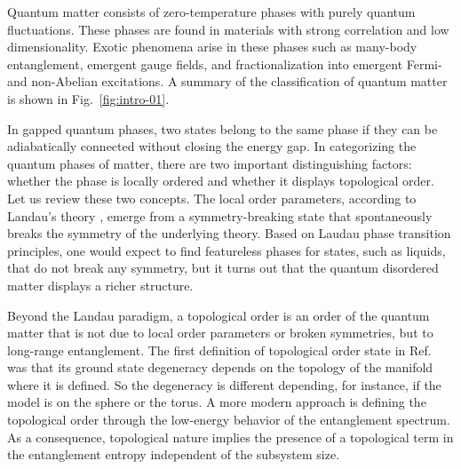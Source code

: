 

Quantum matter consists of zero-temperature phases with purely quantum fluctuations. %
These phases are found in materials with strong correlation and low dimensionality.
Exotic phenomena arise in these phases such as many-body entanglement, emergent gauge fields, and fractionalization into emergent Fermi- and non-Abelian excitations.
A summary of the classification of quantum matter is shown in Fig.~\ref{fig:intro-01}.


In gapped quantum phases, two states belong to the same phase if they can be adiabatically connected without closing the energy gap.
In categorizing the quantum phases of matter, there are two important distinguishing factors: whether the phase is locally ordered and whether it displays topological order.
Let us review these two concepts.
The local order parameters, according to Landau's theory \cite{landau2008}, emerge from a symmetry-breaking state that spontaneously breaks the symmetry of the underlying theory. %
Based on Laudau phase transition principles, one would expect to find featureless phases for states, such as liquids, that do not break any symmetry, but it turns out that the quantum disordered matter displays a richer structure.

Beyond the Landau paradigm, a topological order is an order of the quantum matter that is not due to local order parameters or broken symmetries, but to long-range entanglement. The first definition of topological order state in Ref.~\cite{Wen1990} was that its ground state degeneracy depends on the topology of the manifold where it is defined. So the degeneracy is different depending, for instance, if the model is on the sphere or the torus.
A more modern approach is defining the topological order through the low-energy behavior of the entanglement spectrum. As a consequence, topological nature implies the presence of a topological term in the entanglement entropy independent of the subsystem size.





